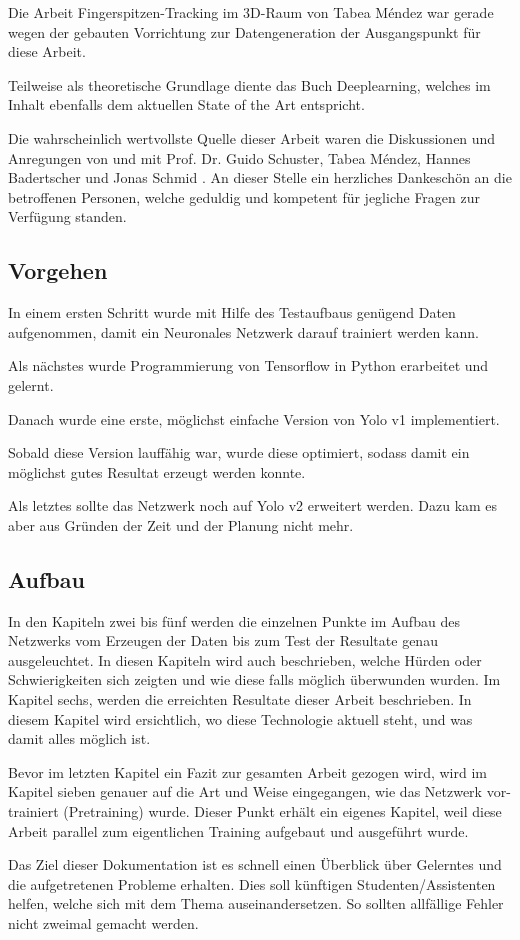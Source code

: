 Die Arbeit \grqq{}Fingerspitzen-Tracking im 3D-Raum\grqq{} von Tabea Méndez \cite{TabeasFingertracking} war gerade wegen der gebauten Vorrichtung zur Datengeneration der Ausgangspunkt für diese Arbeit.

Teilweise als theoretische Grundlage diente das Buch Deeplearning\cite{deeplearning}, welches im Inhalt ebenfalls dem aktuellen State of the Art entspricht.

Die wahrscheinlich wertvollste Quelle dieser Arbeit waren die Diskussionen und Anregungen von und mit Prof. Dr. Guido Schuster, Tabea Méndez, Hannes Badertscher und Jonas Schmid \cite{PrivateCommunication}. An dieser Stelle ein herzliches Dankeschön an die betroffenen Personen, welche geduldig und kompetent für jegliche Fragen zur Verfügung standen.

\subsection{Vorgehen}
\label{chapter:vorgehen}
In einem ersten Schritt wurde mit Hilfe des Testaufbaus\cite{TabeasFingertracking} genügend Daten aufgenommen, damit ein Neuronales Netzwerk darauf trainiert werden kann.

Als nächstes wurde Programmierung von Tensorflow in Python erarbeitet und gelernt.

Danach wurde eine erste, möglichst einfache Version von Yolo v1\cite{yolo} implementiert.

Sobald diese Version lauffähig war, wurde diese optimiert, sodass damit ein möglichst gutes Resultat erzeugt werden konnte. 

Als letztes sollte das Netzwerk noch auf Yolo v2\cite{yolo2} erweitert werden. 
Dazu kam es aber aus Gründen der Zeit und der Planung nicht mehr.

\subsection{Aufbau}
In den Kapiteln zwei bis fünf werden die einzelnen Punkte im Aufbau des Netzwerks vom Erzeugen der Daten bis zum Test der Resultate genau ausgeleuchtet.
In diesen Kapiteln wird auch beschrieben, welche Hürden oder Schwierigkeiten sich zeigten und wie diese falls möglich überwunden wurden.
Im Kapitel sechs, werden die erreichten Resultate dieser Arbeit beschrieben.
In diesem Kapitel wird ersichtlich, wo diese Technologie aktuell steht, und was damit alles möglich ist.

Bevor im letzten Kapitel ein Fazit zur gesamten Arbeit gezogen wird, wird im Kapitel sieben genauer auf die Art und Weise eingegangen, wie das Netzwerk vor-trainiert (Pretraining) wurde. 
Dieser Punkt erhält ein eigenes Kapitel, weil diese Arbeit \grqq{}parallel\grqq{} zum eigentlichen Training aufgebaut und ausgeführt wurde.

Das Ziel dieser Dokumentation ist es schnell einen Überblick über Gelerntes und die aufgetretenen Probleme erhalten.
Dies soll künftigen Studenten/Assistenten helfen, welche sich mit dem Thema auseinandersetzen.
So sollten allfällige Fehler nicht zweimal gemacht werden.

